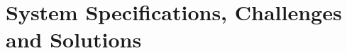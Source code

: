 \documentclass[12pt,letterpaper]{memoir}
\numberwithin{equation}{chapter}
\numberwithin{figure}{chapter}
\numberwithin{table}{chapter}
\begin{document}
\chapter{System Specifications, Challenges and Solutions}\label{c:specs}
















\printbibliography
\end{document}
